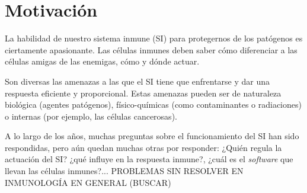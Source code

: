 %
%


\section{Motivación}


La habilidad de nuestro sistema inmune (SI) para protegernos de los patógenos es ciertamente apasionante. Las células inmunes deben saber cómo diferenciar a las células amigas de las enemigas, cómo y dónde actuar.

Son diversas las amenazas a las que el SI tiene que enfrentarse y dar una respuesta eficiente y proporcional. Estas amenazas pueden ser de naturaleza biológica (agentes patógenos), físico-químicas (como contaminantes o radiaciones) o internas (por ejemplo, las células cancerosas).

A lo largo de los años, muchas preguntas sobre el funcionamiento del SI han sido respondidas, pero aún quedan muchas otras por responder: ¿Quién regula la actuación del SI? ¿qué influye en la respuesta inmune?, ¿cuál es el \textit{software} que llevan las células inmunes?... PROBLEMAS SIN RESOLVER EN INMUNOLOGÍA EN GENERAL (BUSCAR)


